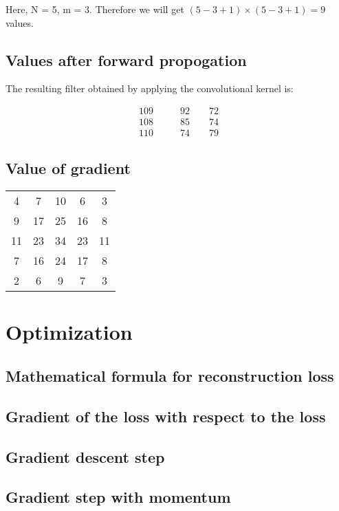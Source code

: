 \documentclass{article}
\begin{document}
Here, N = 5, m = 3.
Therefore we will get $(5-3+1) \times (5-3+1) = 9$ values.
\subsection{Values after forward propogation}
The resulting filter obtained by applying the convolutional kernel is:
\begin{centering}
  \begin{align*}
  109 &\qquad 92 \qquad 72 \\
  108 &\qquad 85 \qquad 74 \\
  110 &\qquad 74 \qquad 79
  \end{align*}
\end{centering}

\subsection{Value of gradient}
\begin{center}
\begin{tabular}{c c c c c }
   4 &   7  &  10  &   6  &   3 \\
   9 &  17  &  25 &   16 &    8 \\
  11 & 23  &  34 &   23 &   11 \\
   7 & 16 &   24 &   17 &    8 \\
   2 &  6 &    9 &    7 &    3
\end{tabular}
\end{center}

\section{Optimization}
\subsection{Mathematical formula for reconstruction loss}
\subsection{Gradient of the loss with respect to the loss}
\subsection{Gradient descent step}
\subsection{Gradient step with momentum}
\end{document}
